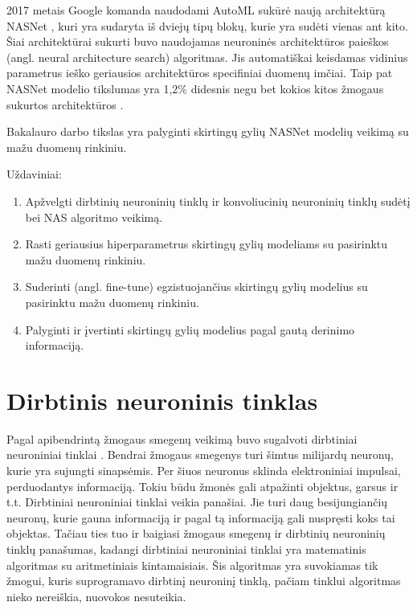 \documentclass{VUMIFPSbakalaurinis}
\begin{document}
2017 metais Google komanda naudodami AutoML sukūrė naują architektūrą NASNet \cite{DBLP:journals/corr/ZophVSL17}, kuri yra sudaryta iš dviejų tipų blokų, kurie yra sudėti vienas ant kito. 
Šiai architektūrai sukurti buvo naudojamas neuroninės architektūros paieškos (angl. neural architecture search) algoritmas. Jis automatiškai keisdamas vidinius parametrus ieško geriausios architektūros specifiniai duomenų imčiai.
Taip pat NASNet modelio tikslumas yra 1,2\% didesnis negu bet kokios kitos žmogaus sukurtos architektūros \cite{DBLP:journals/corr/ZophVSL17}.

Bakalauro darbo tikslas yra palyginti skirtingų gylių NASNet modelių veikimą su mažu duomenų rinkiniu.

Uždaviniai:
\begin{enumerate}
    \item Apžvelgti dirbtinių neuroninių tinklų ir konvoliucinių neuroninių tinklų sudėtį bei NAS algoritmo veikimą.
    \item Rasti geriausius hiperparametrus skirtingų gylių modeliams su pasirinktu mažu duomenų rinkiniu.
    \item Suderinti (angl. fine-tune) egzistuojančius skirtingų gylių modelius su pasirinktu mažu duomenų rinkiniu.
    \item Palyginti ir įvertinti skirtingų gylių modelius pagal gautą derinimo informaciją.
\end{enumerate}

\section{Dirbtinis neuroninis tinklas}
Pagal apibendrintą žmogaus smegenų veikimą buvo sugalvoti dirbtiniai neuroniniai tinklai \cite{Goodfellow-et-al-2016}. Bendrai žmogaus smegenys turi šimtus
milijardų neuronų, kurie yra sujungti sinapsėmis. Per šiuos neuronus sklinda elektroniniai impulsai, perduodantys informaciją. Tokiu būdu žmonės gali 
atpažinti objektus, garsus ir t.t. Dirbtiniai neuroniniai tinklai veikia panašiai. Jie turi daug besijungiančių neuronų, kurie gauna informaciją ir 
pagal tą informaciją gali nuspręsti koks tai objektas. Tačiau ties tuo ir baigiasi žmogaus smegenų ir dirbtinių neuroninių tinklų panašumas, 
kadangi dirbtiniai neuroniniai tinklai yra matematinis algoritmas su aritmetiniais kintamaisiais. Šis algoritmas yra suvokiamas 
tik žmogui, kuris suprogramavo dirbtinį neuroninį tinklą, pačiam tinklui algoritmas nieko nereiškia, nuovokos nesuteikia.
\end{document}
